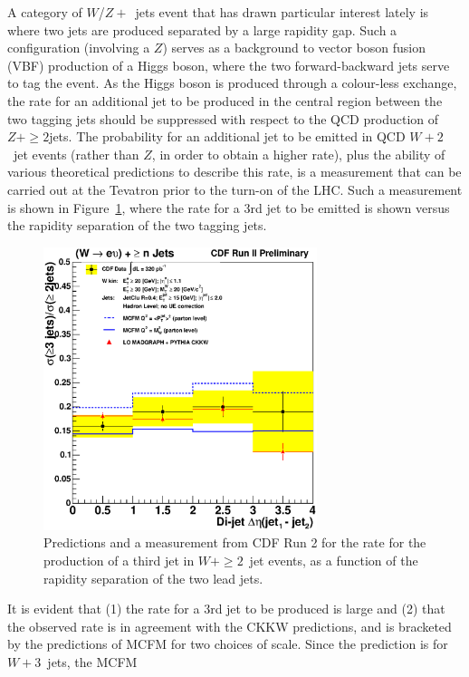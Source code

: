 \documentclass[12pt]{iopart}
\begin{document}
A category of $W$/$Z +$~jets event that has drawn particular interest lately is where  two jets are produced separated by a large
rapidity gap. Such a configuration (involving a $Z$) serves as a background to vector boson fusion (VBF) production of a
Higgs boson, where
the two  forward-backward jets serve to tag the event. As the Higgs boson is produced through a colour-less exchange, the rate for an
additional jet to be produced in the central region between the two  tagging jets should be suppressed with respect to the QCD
production of $Z + \ge 2$jets. The  probability for an additional jet to be emitted in QCD $W + 2$~jet events
(rather than $Z$, in order to obtain a higher rate), plus the ability of various theoretical predictions to describe  this rate, is a measurement that can be
carried out at the Tevatron prior to the turn-on of  the LHC. Such a measurement is shown in Figure~\ref{fig:tev_w_jets_8}, where the
rate for a 3rd jet to be emitted is shown versus the rapidity separation of the two tagging jets.
%
\begin{figure}
\begin{center}
\includegraphics[width=8cm]{deltaeta_xsection.eps}
\end{center}
\caption{Predictions and a measurement from CDF Run 2 for the rate for the production of a third jet in  $W + \ge 2$~jet events,
as a function of the rapidity separation of the two lead jets. 
\label{fig:tev_w_jets_8}}
\end{figure}
%
It is evident that (1) the rate for a 3rd jet to be produced is large and (2) that the observed rate is in agreement with the CKKW
predictions,  and is bracketed by the predictions  of MCFM for two choices of scale. Since the prediction is for $W + 3$~jets, the MCFM
\end{document}
